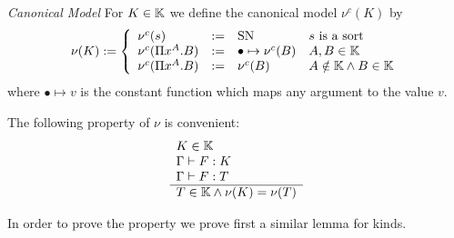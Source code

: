 \begin{definition}
    \emph{Canonical Model} For $K \in \mathbb{K}$ we define the
    canonical model $\nu^c(K)$ by
    $$
        \nu(K) :=
        \left \{
        \begin{array}{llll}
            \nu^c(s) &:=& \text{SN} & s \text{ is a sort}
            \\
            \nu^c(\Pi x^A. B)
            &:=&
            \bullet \mapsto \nu^c(B) & A,B \in \mathbb{K}
            \\
            \nu^c(\Pi x^A. B)
            &:=&
            \nu^c(B) & A \notin \mathbb{K} \land B \in \mathbb{K}
        \end{array}
        \right.
    $$
    where $\bullet \mapsto v$ is the constant function which maps any argument
    to the value $v$.
\end{definition}


The following property of $\nu$ is convenient:
$$
    \begin{array}{l} 
        K \in \mathbb{K}
        \\
        \Gamma \vdash F: K
        \\
        \Gamma \vdash F: T
     \\ \hline 
        T \in \mathbb{K} \land \nu(K) = \nu(T)
    \end{array}
$$


In order to prove the property we prove first a similar lemma for kinds.

